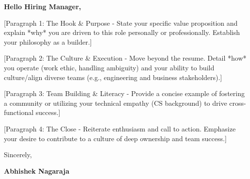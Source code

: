 \documentclass[11pt,letterpaper]{article} %
\begin{document}
\vspace{1.5em}

\textbf{Hello Hiring Manager,}

[Paragraph 1: The Hook \& Purpose - State your specific value proposition and explain *why* you are driven to this role personally or professionally. Establish your philosophy as a builder.]

[Paragraph 2: The Culture \& Execution - Move beyond the resume. Detail *how* you operate (work ethic, handling ambiguity) and your ability to build culture/align diverse teams (e.g., engineering and business stakeholders).]

[Paragraph 3: Team Building \& Literacy - Provide a concise example of fostering a community or utilizing your technical empathy (CS background) to drive cross-functional success.]

[Paragraph 4: The Close - Reiterate enthusiasm and call to action. Emphasize your desire to contribute to a culture of deep ownership and team success.]

\vspace{1.5em}
Sincerely,

\vspace{2.5em} %
\textbf{Abhishek Nagaraja}
\end{document}
